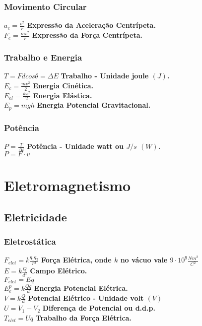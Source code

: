 \documentclass[
    12pt, %
    openright,
    twoside, %
    a4paper, %
    article,
    english,brazil %
]{abntex2}
\begin{document}
\subsection{Movimento Circular}

$a_c = \frac{v^2}{r}$ \quad \textbf{Expressão da Aceleração Centrípeta.} \\
$F_c = \frac{mv^2}{r}$ \quad \textbf{Expressão da Força Centrípeta.} \\

\subsection{Trabalho e Energia}

$T = Fdcos\theta = \Delta E$ \quad \textbf{Trabalho - Unidade joule $(J)$.} \\
$E_c = \frac{mv^2}{2}$ \quad \textbf{Energia Cinética.} \\
$E_{el} = \frac{kx^2}{2}$ \quad \textbf{Energia Elástica.} \\
$E_{p} = mgh$ \quad \textbf{Energia Potencial Gravitacional.} \\

\subsection{Potência}

$P = \frac{T}{\Delta t}$ \quad \textbf{Potência - Unidade watt ou $J/s$ $(W)$.} \\
$P = F \cdot v$ \\

\chapter{Eletromagnetismo}

\section{Eletricidade}

\subsection{Eletrostática}

$F_{elet} = k\frac{q_1q_2}{r^2}$ \textbf{Força Elétrica, onde $k$ no vácuo vale $9 \cdot 10^9 \frac{Nm^2}{C^2}$} \\
$E = k\frac{Q}{d^2}$  \quad \textbf{Campo Elétrico.} \\
$F_{elet} = Eq$ \\
$E^{p}_{e} = k\frac{Qq}{d}$ \quad \textbf{Energia Potencial Elétrica.} \\
$V = k\frac{Q}{d}$ \quad \textbf{Potencial Elétrico - Unidade volt $(V)$} \\
$U = V_1 - V_2$ \quad \textbf{Diferença de Potencial ou d.d.p.} \\
$T_{elet} = Uq$ \quad \textbf{Trabalho da Força Elétrica.} \\
\end{document}
